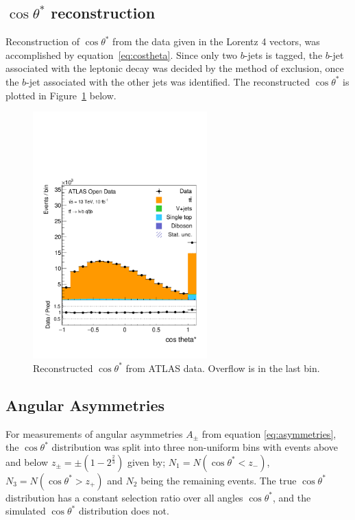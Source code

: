 \documentclass[12pt,a4paper]{article}
\numberwithin{equation}{section}
\begin{document}
\subsection{$\cos \theta^{*}$ reconstruction}
Reconstruction of $\cos \theta^{*}$ from the data given in the Lorentz 4 vectors, was
accomplished by equation~\eqref{eq:costheta}. Since only two $b$-jets is tagged,
the $b$-jet associated with the leptonic decay was decided by the method of
exclusion, once the $b$-jet associated with the other jets was identified. The
reconstructed $\cos \theta^{*}$ is plotted in Figure~\ref{fig:costhetaatlas} below.
\begin{figure}[H]
  \centering
  \includegraphics[width=0.6\textwidth]{figures/hist_costheta_overflow}
  \caption{\label{fig:costhetaatlas}Reconstructed $\cos \theta^{*}$ from ATLAS data. Overflow is in the last bin.}
\end{figure}

\subsection{Angular Asymmetries}
For measurements of angular asymmetries $A_{\pm}$ from equation
\eqref{eq:asymmetries}, the $\cos\theta^{*}$ distribution was split into three
non-uniform bins with events above and below $z_{\pm} = \pm(1-2^{\frac{2}{3}})$
given by; $N_1 = N(\cos \theta^{*}<z_-)$, $N_3 = N(\cos \theta^{*}>z_+)$ and $N_2$ being
the remaining events. The true $\cos\theta^*$ distribution has a constant selection ratio over all angles $\cos\theta^*$, and the simulated $\cos\theta^*$ distribution does not.  \\
\end{document}
